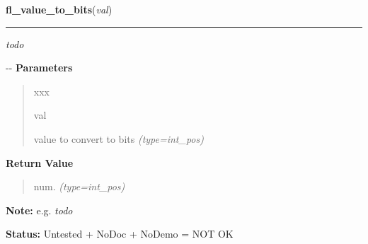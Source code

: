     \label{xformslib:flflimage:fl_value_to_bits}

    \vspace{0.5ex}

\hspace{.8\funcindent}\begin{boxedminipage}{\funcwidth}

    \raggedright \textbf{fl\_value\_to\_bits}(\textit{val})

    \vspace{-1.5ex}

    \rule{\textwidth}{0.5\fboxrule}
\setlength{\parskip}{2ex}

\emph{todo}

-{}-
\setlength{\parskip}{1ex}
      \textbf{Parameters}
      \vspace{-1ex}

      \begin{quote}
        \begin{Ventry}{xxx}

          \item[val]


value to convert to bits
            {\it (type=int\_pos)}

        \end{Ventry}

      \end{quote}

      \textbf{Return Value}
    \vspace{-1ex}

      \begin{quote}

num.
      {\it (type=int\_pos)}

      \end{quote}

\textbf{Note:} 
e.g. \emph{todo}


\textbf{Status:} 
Untested + NoDoc + NoDemo = NOT OK


    \end{boxedminipage}

    \label{xformslib:flflimage:flimage_add_comments}

    \vspace{0.5ex}

